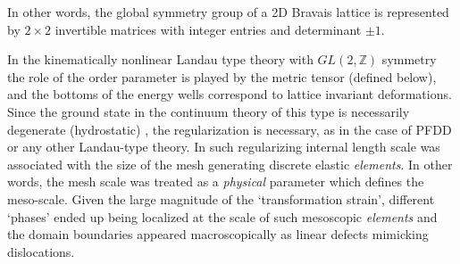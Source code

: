 \documentclass[CRPHYS,Unicode,manuscript]{cedram}
\begin{document}
In other words, the  global symmetry group of a 2D Bravais lattice   is  represented  by   $2\times 2$ invertible matrices with integer entries and determinant $\pm1$.     
 
In the   kinematically   nonlinear  Landau type theory  with $GL(2,\mathbb{Z})$ symmetry the role of the order parameter is  played by the  metric tensor (defined below), and    the  bottoms of the energy wells correspond to lattice invariant deformations. 
  Since the    ground state in the continuum  theory of this type   is  necessarily degenerate (hydrostatic)  \cite{Ericksen1973-yt,Fonseca1987-pd},  the  regularization is necessary, as in the case of PFDD or any other Landau-type theory. In \cite{Baggio2019-rs}   such regularizing internal length scale was associated with  the size of the  mesh generating discrete  elastic \emph{elements}. In other words, the mesh scale was treated as a \emph{physical} parameter  which defines the meso-scale.  Given  the large magnitude of the `transformation strain',   different  `phases'  ended up being    localized at the scale of such mesoscopic \emph{elements}  and the domain boundaries appeared macroscopically  as linear defects  mimicking  dislocations. 
 
\end{document}
